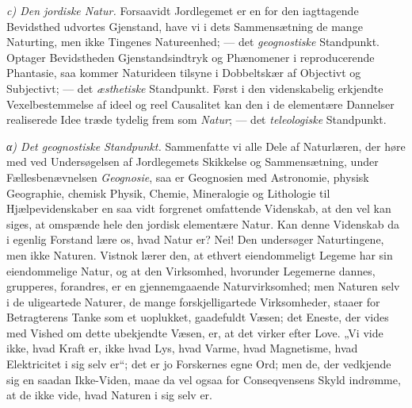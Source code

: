 \documentclass[12pt,a4paper]{book}
\newcommand{\runin}[1]{\emph{#1}\hspace{0.4em}}
\newcommand{\subrunin}[1]{\emph{#1}\hspace{0.4em}}
\begin{document}
\runin{c) Den jordiske Natur.} Forsaavidt Jordlegemet er en for den
iagttagende Bevidsthed udvortes Gjenstand, have
vi i dets Sammensætning de mange Naturting, men ikke Tingenes
Natureenhed; --- det \emph{geognostiske} Standpunkt. Optager Bevidstheden
Gjenstandsindtryk og Phænomener i reproducerende Phantasie, saa kommer
Naturideen tilsyne i Dobbeltskær af Objectivt og Subjectivt; --- det
\emph{æsthetiske} Standpunkt. Først i den videnskabelig erkjendte
Vexelbestemmelse af ideel og reel Causalitet kan den i de elementære
Dannelser realiserede Idee træde tydelig frem som \emph{Natur}; --- det
\emph{teleologiske} Standpunkt.

\subrunin{α) Det geognostiske Standpunkt.} Sammenfatte vi alle Dele af
Naturlæren, der høre med ved Undersøgelsen af Jordlegemets Skikkelse og
Sammensætning, under Fællesbenævnelsen \emph{Geognosie}, saa er
Geognosien med Astronomie, physisk Geographie, chemisk Physik, Chemie,
Mineralogie og Lithologie til Hjælpevidenskaber en saa vidt forgrenet
omfattende Videnskab, at den vel kan siges, at omspænde hele den jordisk
elementære Natur. Kan denne Videnskab da i egenlig Forstand lære os, hvad
Natur er? Nei! Den undersøger Naturtingene, men ikke Naturen. Vistnok
lærer den, at ethvert eiendommeligt Legeme har sin eiendommelige Natur, og
at den Virksomhed, hvorunder Legemerne dannes, grupperes, forandres, er en
gjennemgaaende Naturvirksomhed; men Naturen selv i de uligeartede Naturer,
de mange forskjelligartede Virksomheder, staaer for Betragterens Tanke som
et uoplukket, gaadefuldt Væsen; det Eneste, der vides med Vished om dette
ubekjendte Væsen, er, at det virker efter Love. „Vi vide ikke, hvad Kraft
er, ikke hvad Lys, hvad Varme, hvad Magnetisme, hvad Elektricitet i sig
selv er“; det er jo Forskernes egne Ord; men de, der vedkjende sig en
saadan Ikke-Viden, maae da vel ogsaa for Conseqvensens Skyld indrømme, at
de ikke vide, hvad Naturen i sig selv er.
\end{document}
